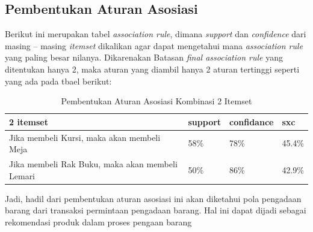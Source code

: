 \subsection{Pembentukan Aturan Asosiasi}
\par Berikut ini merupakan tabel \textit{association rule}, dimana \textit{support} dan \textit{confidence} dari masing – masing \textit{itemset} dikalikan agar dapat mengetahui mana \textit{association rule} yang paling besar nilanya. Dikarenakan Batasan \textit{final association rule} yang ditentukan hanya 2, maka aturan yang diambil hanya 2 aturan tertinggi seperti yang ada pada tbael berikut:
\begin{table}[!h]
\caption{Pembentukan Aturan Asosiasi Kombinasi 2 Itemset}
\centering
\begin{tabular}{|l|l|l|l|}
\hline
2 itemset                                       & support & confidance & sxc\\ \hline
Jika membeli Kursi, maka akan membeli Meja      & 58\%    & 78\%       & 45.4\%               \\ \hline
Jika membeli Rak Buku, maka akan membeli Lemari & 50\%    & 86\%       & 42.9\%               \\ \hline
\end{tabular}
\end{table}

\par Jadi, hadil dari pembentukan aturan asosiasi ini akan diketahui pola pengadaan barang dari transaksi permintaan pengadaan barang. Hal ini dapat dijadi sebagai rekomendasi produk dalam proses pengaan barang

